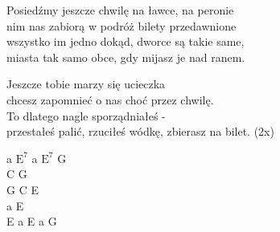 \begin{text}
    \hfill\break
    Posiedźmy jeszcze chwilę na ławce, na peronie\\
    nim nas zabiorą w podróż bilety przedawnione\\
    wszystko im jedno dokąd, dworce są takie same,\\
    miasta tak samo obce, gdy mijasz je nad ranem.

    Jeszcze tobie marzy się ucieczka\\
    chcesz zapomnieć o nas choć przez chwilę.\\
    To dlatego nagle sporządniałeś -\\
    przestałeś palić, rzuciłeś wódkę, zbierasz na bilet. (2x)
\end{text}
\begin{chord}
    a $\mathrm{E^7}$ a $\mathrm{E^7}$ G\\
    C G\\
    G C E\\
    a E\\
    E a E a G
\end{chord}
